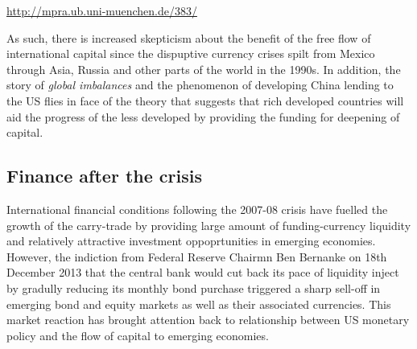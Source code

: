 \documentclass[12pt, a4paper, oneside]{article} %
\begin{document}
 \href{http://mpra.ub.uni-muenchen.de/383/}{http://mpra.ub.uni-muenchen.de/383/}

As such, there is increased skepticism about the benefit of the free flow of international capital since the dispuptive currency crises spilt from Mexico through Asia, Russia and other parts of the world in the 1990s.  In addition, the story of \emph{global imbalances} and the phenomenon of developing China lending to the US flies in face of the theory that suggests that rich developed countries will aid the progress of the less developed by providing the funding for deepening of capital.  

\subsection{Finance after the crisis}
International financial conditions following the 2007-08 crisis have fuelled the growth of the carry-trade by providing large amount of funding-currency liquidity and relatively attractive investment oppoprtunities in emerging economies. However, the indiction from Federal Reserve Chairmn Ben Bernanke on 18th December 2013 that the central bank would cut back its pace of liquidity inject by gradully reducing its monthly bond purchase triggered a sharp sell-off in emerging bond and equity markets as well as their associated currencies.  This market reaction has brought attention back to relationship between US monetary policy and the flow of capital to emerging economies.  
\end{document}
